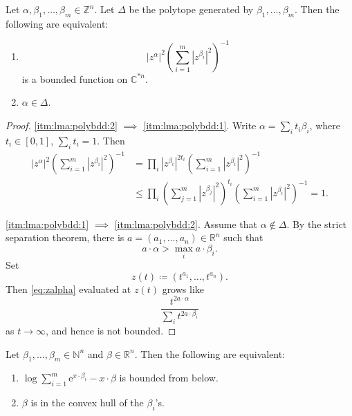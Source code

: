 \begin{lemma}\label{lma:polybdd}
	Let $\alpha,\beta_1,\ldots,\beta_m\in \mathbb{Z}^n$. Let $\Delta$ be the polytope generated by $\beta_1,\ldots,\beta_m$. Then the following are equivalent:
	\begin{enumerate}
		\item\label{itm:lma:polybdd:1}
		      \begin{equation}\label{eq:zalpha}
			      |z^{\alpha}|^2\left(\sum_{i=1}^m |z^{\beta_i}|^2 \right)^{-1}
		      \end{equation}
		      is a bounded function on $\mathbb{C}^{*n}$.
		\item\label{itm:lma:polybdd:2} $\alpha\in \Delta$.
	\end{enumerate}
\end{lemma}
\begin{proof}
	\ref{itm:lma:polybdd:2} $\implies$ \ref{itm:lma:polybdd:1}. Write $\alpha=\sum_i t_i\beta_i$, where $t_i\in [0,1]$, $\sum_i t_i=1$. Then
	\[
 \begin{aligned}
			|z^{\alpha}|^2\left(\sum_{i=1}^m |z^{\beta_i}|^2 \right)^{-1}
            &=\prod_i |z^{\beta_i}|^{2t_i}\left(\sum_{i=1}^m |z^{\beta_i}|^2 \right)^{-1}\\
            &\leq \prod_i\left(\sum_{j=1}^m |z^{\beta_j}|^2\right)^{t_i}
            \left(\sum_{i=1}^m |z^{\beta_i}|^2 \right)^{-1}=1.
	  \end{aligned}
		\]

		\ref{itm:lma:polybdd:1} $\implies$ \ref{itm:lma:polybdd:2}. Assume that $\alpha\not\in \Delta$. By the strict separation theorem, there is $a=(a_1,\ldots,a_n)\in\mathbb{R}^n$ such that
        \[
        a\cdot\alpha>\max_i a\cdot\beta_i.
        \]
        Set
		\[
			z(t)\coloneqq (t^{a_1},\ldots,t^{a_n}).
		\]
		Then \eqref{eq:zalpha} evaluated at $z(t)$ grows like
        \[
        \frac{t^{2a\cdot \alpha}}{\sum_i t^{2a\cdot\beta_i}}
        \]
        as $t\to\infty$, and hence is not bounded.
\end{proof}
\begin{lemma}\label{lma:polybdd2}
	Let $\beta_1,\ldots,\beta_m\in \mathbb{N}^n$ and $\beta\in \mathbb{R}^n$. Then the following are equivalent:
	\begin{enumerate}
		\item\label{itm:lma:polybdd2:1} $\log \sum_{i=1}^m \mathrm{e}^{x\cdot\beta_i}-x\cdot\beta$ is bounded from below.
		\item\label{itm:lma:polybdd2:2} $\beta$ is in the convex hull of the $\beta_i$'s.
	\end{enumerate}
\end{lemma}
